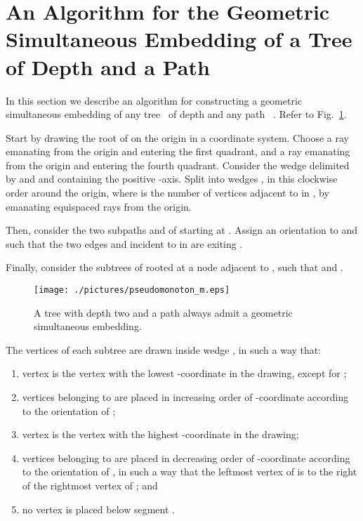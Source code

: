 \documentclass[a4paper,10pt]{llncs}
\newcommand{\T}{\mbox{ }}
\renewcommand{\P}{\mbox{ }}
\begin{document}
\section{An Algorithm for the Geometric Simultaneous Embedding of a Tree of Depth  and a Path}\label{se:depth2}

In this section we describe an algorithm for constructing a geometric simultaneous embedding of any tree \T of depth  and any path \P. Refer to Fig.~\ref{fig:pseudo}.

Start by drawing the root  of  on the origin in a coordinate system. Choose a ray  emanating from the origin and entering the first quadrant, and a ray  emanating from the origin and entering the fourth quadrant.
Consider the wedge  delimited by  and  and containing the positive -axis. Split  into  wedges , in this clockwise order around the origin, where  is the number of vertices adjacent to  in , by emanating  equispaced rays from the origin.

Then, consider the two subpaths  and  of  starting at . Assign an orientation to  and  such that the two edges  and  incident to  in  are exiting .

Finally, consider the  subtrees  of  rooted at a node adjacent to , such that  and .

\begin{figure}[h]
\begin{center}
\texttt{[image: ./pictures/pseudomonoton\_m.eps]}
\caption{A tree with depth two and a path always admit a geometric simultaneous embedding.}
\label{fig:pseudo}
\end{center}
\end{figure}

The vertices of each subtree  are drawn inside wedge , in such a way that:
\begin{enumerate}
\item vertex  is the vertex with the lowest -coordinate in the drawing, except for ;
\item vertices belonging to  are placed in increasing order of -coordinate according to the orientation of ;
\item vertex  is the vertex with the highest -coordinate in the drawing;
\item vertices belonging to  are placed in decreasing order of -coordinate according to the orientation of , in such a way that the leftmost vertex of  is to the right of the rightmost vertex of ; and
\item no vertex is placed below segment .
\end{enumerate}
\end{document}
